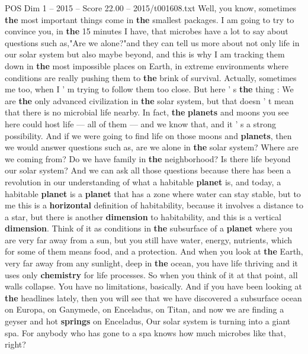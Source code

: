 \begin{textsample}{POS Dim 1 – 2015 – Score 22.00 – 2015/t001608.txt}  \label{ex:f1_pos_040}
Well, you know, sometimes \textbf{the} most important things come in \textbf{the} smallest packages.
I am going to try to convince you, in \textbf{the} 15 minutes I have, that microbes have a lot to say about questions such as,"Are we alone?"and they can tell us more about not only life in our solar system but also maybe beyond, and this is why I am tracking them down in \textbf{the} most impossible places on Earth, in extreme environments where conditions are really pushing them to \textbf{the} brink of survival.
Actually, sometimes me too, when I ' m trying to follow them too close.
But here ' s \textbf{the} thing : We are \textbf{the} only advanced civilization in \textbf{the} solar system, but that doesn ' t mean that there is no microbial life nearby.
In fact, \textbf{the} \textbf{planets} and moons you see here could host life — all of them — and we know that, and it ' s a strong possibility.
And if we were going to find life on those moons and \textbf{planets}, then we would answer questions such as, are we alone in \textbf{the} solar system?
Where are we coming from?
Do we have family in \textbf{the} neighborhood?
Is there life beyond our solar system?
And we can ask all those questions because there has been a revolution in our understanding of what a habitable \textbf{planet} is, and today, a habitable \textbf{planet} is a \textbf{planet} that has a zone where water can stay stable, but to me this is a \textbf{horizontal} definition of habitability, because it involves a distance to a star, but there is another \textbf{dimension} to habitability, and this is a vertical \textbf{dimension}.
Think of it as conditions in \textbf{the} subsurface of a \textbf{planet} where you are very far away from a sun, but you still have water, energy, nutrients, which for some of them means food, and a protection.
And when you look at \textbf{the} Earth, very far away from any sunlight, deep in \textbf{the} ocean, you have life thriving and it uses only \textbf{chemistry} for life processes.
So when you think of it at that point, all walls collapse.
You have no limitations, basically.
And if you have been looking at \textbf{the} headlines lately, then you will see that we have discovered a subsurface ocean on Europa, on Ganymede, on Enceladus, on Titan, and now we are finding a geyser and hot \textbf{springs} on Enceladus, Our solar system is turning into a giant spa.
For anybody who has gone to a spa knows how much microbes like that, right?

\end{textsample}
